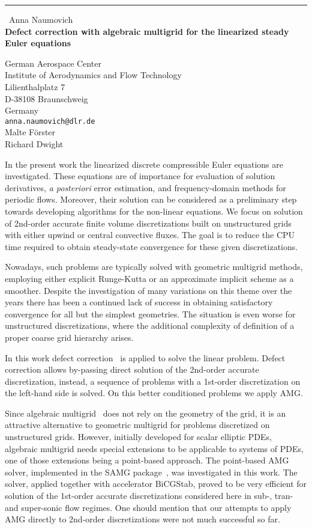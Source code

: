 \documentclass{report}
\begin{document}
\begin{center}
\rule{6in}{1pt} \
{\large Anna Naumovich \\
{\bf Defect correction with algebraic multigrid for the linearized steady Euler equations}}

German Aerospace Center \\ Institute of Aerodynamics and Flow Technology \\ Lilienthalplatz 7 \\ D-38108 Braunschweig \\ Germany
\\
{\tt anna.naumovich@dlr.de}\\
Malte Förster\\
Richard Dwight\end{center}

In the present work the linearized discrete compressible Euler equations
are investigated.
These equations are of importance for evaluation of solution derivatives,
{\it a posteriori} error estimation, and frequency-domain methods for periodic flows.
Moreover, their solution can be considered as a preliminary step towards developing
algorithms for the non-linear equations. We focus on solution of 2nd-order accurate
finite volume discretizations built on unstructured grids with either upwind or central
convective fluxes. The goal is to reduce the CPU time required to obtain steady-state
convergence for these given discretizations.

Nowadays, such problems are typically solved with geometric multigrid methods,
employing either explicit Runge-Kutta or an approximate implicit scheme as a smoother.
Despite the investigation of many variations on this theme over the years there has
been a continued lack of success in obtaining satisfactory convergence for all but
the simplest geometries. The situation is even worse for unstructured discretizations,
where the additional complexity of definition of a proper coarse grid hierarchy arises.

In this work defect correction~\cite{DC1, DC2} is applied to solve the linear problem.
Defect correction allows by-passing direct solution of the 2nd-order
accurate discretization,
instead, a sequence of problems with a 1st-order discretization on the left-hand side
is solved. On this better conditioned problems we apply AMG.

Since algebraic multigrid~\cite{AMG1, AMG2, AMG3} does not rely on the
geometry of the grid,
it is an attractive alternative to geometric multigrid for problems
discretized on unstructured grids.
However, initially developed for scalar elliptic PDEs, algebraic
multigrid needs special extensions
to be applicable to systems of PDEs, one of those extensions being a
point-based approach.
The point-based AMG solver, implemented in the SAMG package~\cite{SAMG}, was investigated
in this work. The solver, applied together with accelerator BiCGStab,
proved to be very efficient for
solution of the 1st-order accurate discretizations considered here in
sub-, tran- and super-sonic flow
regimes. One should mention that our attempts to apply AMG directly to
2nd-order discretizations were
not much successful so far.
\end{document}

